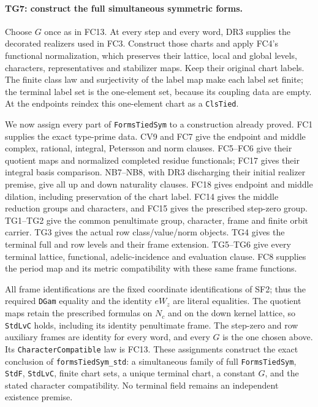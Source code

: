 \paragraph{TG7: construct the full simultaneous symmetric forms.}
Choose $G$ once as in FC13. At every step and every word, DR3
supplies the decorated realizers used in FC3. Construct those
charts and apply FC4's functional normalization, which preserves
their lattice, local and global levels, characters, representatives
and stabilizer maps. Keep their original chart labels. The finite
class law and surjectivity of the label map make each label set
finite; the terminal label set is the one-element set, because
its coupling data are empty. At the endpoints reindex this
one-element chart as a \texttt{ClsTied}.

We now assign every part of \texttt{FormsTiedSym} to a construction
already proved. FC1 supplies the exact type-prime data. CV9 and
FC7 give the endpoint and middle complex, rational, integral,
Petersson and norm clauses. FC5--FC6 give their quotient maps
and normalized completed residue functionals; FC17 gives their
integral basis comparison. NB7--NB8, with DR3 discharging their
initial realizer premise, give all up and down naturality clauses.
FC18 gives endpoint and middle dilation, including preservation
of the chart label. FC14 gives the middle reduction groups and
characters, and FC15 gives the prescribed step-zero group.
TG1--TG2 give the common penultimate group, character, frame and
finite orbit carrier. TG3 gives the actual row class/value/norm
objects. TG4 gives the terminal full and row levels and their
frame extension. TG5--TG6 give every terminal lattice, functional,
adelic-incidence and evaluation clause. FC8 supplies the period
map and its metric compatibility with these same frame functions.

All frame identifications are the fixed coordinate identifications
of SF2; thus the required \texttt{DGam} equality and the identity
$eW_z$ are literal equalities. The quotient maps retain the
prescribed formulas on $N_c$ and on the down kernel lattice,
so \texttt{StdLvC} holds, including its identity penultimate
frame. The step-zero and row auxiliary frames are identity for
every word, and every $G$ is the one chosen above. Its
\texttt{CharacterCompatible} law is FC13. These assignments
construct the exact conclusion of
\texttt{formsTiedSym\_std}: a simultaneous family of full
\texttt{FormsTiedSym}, \texttt{StdF}, \texttt{StdLvC}, finite
chart sets, a unique terminal chart, a constant $G$, and the
stated character compatibility. No terminal field remains an
independent existence premise.

